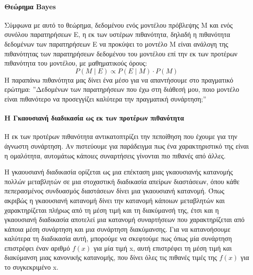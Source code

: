  	\paragraph{Θεώρημα Bayes} Σύμφωνα με αυτό το θεώρημα, δεδομένου ενός μοντέλου πρόβλεψης M και ενός συνόλου παρατηρήσεων Ε, η εκ των υστέρων πιθανότητα, δηλαδή η πιθανότητα δεδομένων των παρατηρήσεων Ε να προκύψει το μοντέλο M είναι ανάλογη της πιθανότητας των παρατηρήσεων δεδομένου του μοντέλου επί την εκ των προτέρων πιθανότητα του μοντέλου, με μαθηματικούς όρους:
 	\begin{equation}
 	P(M \mid E) \propto P(E \mid M) \cdot P(M)
 	\end{equation}
 	Η παραπάνω πιθανότητα μας δίνει ένα μέσο για να απαντήσουμε στο πραγματικό ερώτημα: ”Δεδομένων των παρατηρήσεων που έχω στη διάθεσή μου, ποιο μοντέλο είναι πιθανότερο να προσεγγίζει καλύτερα την πραγματική συνάρτηση;”
 	\paragraph{Η Γκαουσιανή διαδικασία ως εκ των προτέρων πιθανότητα} Η εκ των προτέρων πιθανότητα αντικατοπτρίζει την πεποίθηση που έχουμε για την άγνωστη συνάρτηση. Αν πιστεύουμε για παράδειγμα πως ένα χαρακτηριστικό της είναι η ομαλότητα, αυτομάτως κάποιες συναρτήσεις γίνονται πιο πιθανές από άλλες.
 	
 	Η γκαουσιανή διαδικασία ορίζεται ως μια επέκταση μιας γκαουσιανής κατανομής πολλών μεταβλητών σε μια στοχαστική διαδικασία απείρων διαστάσεων, όπου κάθε πεπερασμένος συνδυασμός διαστάσεων δίνει μια γκαουσιανή κατανομή. Όπως ακριβώς η γκαουσιανή κατανομή δίνει την κατανομή κάποιων μεταβλητών και χαρακτηρίζεται πλήρως από τη μέση τιμή και τη διακύμανσή της, έτσι και η γκαουσιανή διαδικασία αποτελεί μια κατανομή συναρτήσεων που χαρακτηρίζεται από κάποια μέση
 	συνάρτηση και μια συνάρτηση διακύμανσης. Για να κατανοήσουμε καλύτερα τη διαδικασία αυτή, μπορούμε να σκεφτούμε πως όπως μία συνάρτηση επιστρέφει έναν αριθμό $f(x)$ για μία τιμή x, αυτή επιστρέφει τη μέση τιμή και διακύμανση μιας κανονικής κατανομής, που δίνει όλες τις πιθανές τιμές της $f(x)$ για το συγκεκριμένο x.

